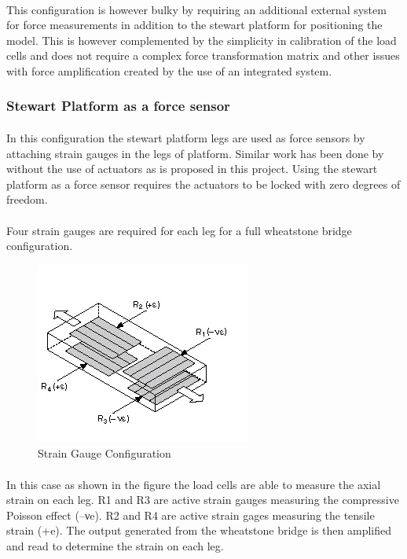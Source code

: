 \paragraph{} This configuration is however bulky by requiring an additional external system for force measurements in addition to the stewart platform for positioning the model. This is however complemented by the simplicity in calibration of the load cells and does not require a complex force transformation matrix and other issues with force amplification created by the use of an integrated system.
\subsubsection{Stewart Platform as a force sensor}
\paragraph{} In this configuration the stewart platform legs are used as force sensors by attaching strain gauges in the legs of platform. Similar work has been done by \cite{ferreira2015design} without the use of actuators as is proposed in this project. Using the stewart platform as a force sensor requires the actuators to be locked with zero degrees of freedom.
\paragraph{} Four strain gauges are required for each leg for a full wheatstone bridge configuration. 
\begin{center}
	\begin{figure}[!h]
		\centering
		\includegraphics{Figures/loadConf}
		\caption{Strain Gauge Configuration \cite{noauthor_measuring_nodate}}
	\end{figure}
\end{center}
\paragraph{}In this case as shown in the figure the load cells are able to measure the axial strain on each leg. R1 and R3 are active strain gauges measuring the compressive Poisson effect (–νe). R2 and R4 are active strain gages measuring the tensile strain (+e). The output generated from the wheatstone bridge is then amplified and read to determine the strain on each leg.
